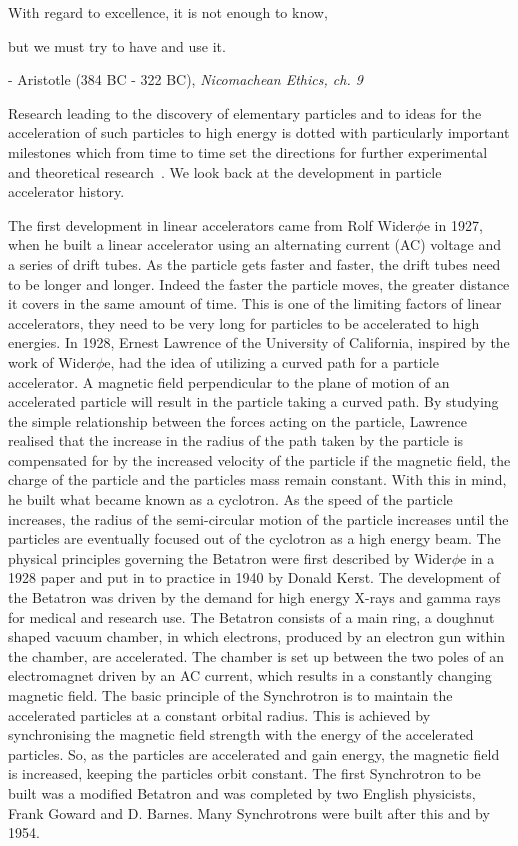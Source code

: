 \centerline{With regard to excellence, it is not enough to know,} 
\centerline{but we must try to have and use it.}
\centerline{- Aristotle (384 BC - 322 BC), \textit{Nicomachean Ethics, ch. 9}}

\vspace{3ex}
Research leading to the discovery of elementary particles and to ideas for the acceleration of such particles to high energy is dotted with particularly important milestones which from time to time set the directions for further experimental and theoretical research~\cite{wiedemann_particle_2015}. We look back at the development in particle accelerator history.

The first development in linear accelerators came from Rolf Wider$\phi$e in 1927, when he built a linear accelerator using an alternating current (AC) voltage and a series of drift tubes. As the particle gets faster and faster, the drift tubes need to be longer and longer. Indeed the faster the particle moves, the greater distance it covers in the same amount of time. This is one of the limiting factors of linear accelerators, they need to be very long for particles to be accelerated to high energies. In 1928, Ernest Lawrence of the University of California, inspired by the work of Wider$\phi$e, had the idea of utilizing a curved path for a particle accelerator. A magnetic field perpendicular to the plane of motion of an accelerated particle will result in the particle taking a curved path. By studying the simple relationship between the forces acting on the particle, Lawrence realised that the increase in the radius of the path taken by the particle is compensated for by the increased velocity of the particle if the magnetic field, the charge of the particle and the particles mass remain constant. With this in mind, he built what became known as a cyclotron. As the speed of the particle increases, the radius of the semi-circular motion of the particle increases until the particles are eventually focused out of the cyclotron as a high energy beam. The physical principles governing the Betatron were first described by Wider$\phi$e in a 1928 paper and put in to practice in 1940 by Donald Kerst. The development of the Betatron was driven by the demand for high energy X-rays and gamma rays for medical and research use. The Betatron consists of a main ring, a doughnut shaped vacuum chamber, in which electrons, produced by an electron gun within the chamber, are accelerated. The chamber is set up between the two poles of an electromagnet driven by an AC current, which results in a constantly changing magnetic field. The basic principle of the Synchrotron is to maintain the accelerated particles at a constant orbital radius. This is achieved by synchronising the magnetic field strength with the energy of the accelerated particles. So, as the particles are accelerated and gain energy, the magnetic field is increased, keeping the particles orbit constant. The first Synchrotron to be built was a modified Betatron and was completed by two English physicists, Frank Goward and D. Barnes. Many Synchrotrons were built after this and by 1954.~\cite{_accelerators_????}

